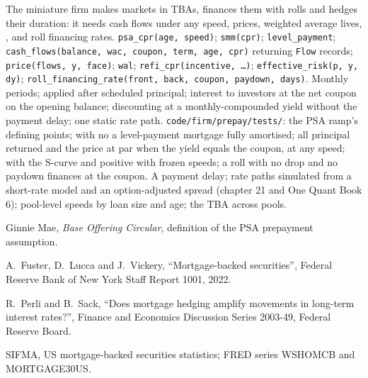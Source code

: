 \begin{build}
 The miniature firm makes markets in TBAs, finances them with
rolls and hedges their duration: it needs cash flows under any speed, prices,
weighted average lives, , and roll financing rates.
 \texttt{psa\_cpr(age, speed)}; \texttt{smm(cpr)};
\texttt{level\_payment}; \texttt{cash\_flows(balance, wac, coupon, term, age,
cpr)} returning \texttt{Flow} records; \texttt{price(flows, y, face)};
\texttt{wal}; \texttt{refi\_cpr(incentive, \ldots)};
\texttt{effective\_risk(p, y, dy)}; \texttt{roll\_financing\_rate(front, back,
coupon, paydown, days)}.
 Monthly periods;  applied after scheduled principal;
interest to investors at the net coupon on the opening balance; discounting at
a monthly-compounded yield without the payment delay; one static rate path.
 \texttt{code/firm/prepay/tests/}: the PSA ramp's
defining points; with no  a level-payment mortgage fully amortised;
all principal returned and the price at par when the yield equals the coupon,
at any speed;  with the S-curve and positive with frozen
speeds; a roll with no drop and no paydown finances at the coupon.
 A payment delay; rate paths simulated from a short-rate model
and an option-adjusted spread (chapter 21 and One Quant Book 6); pool-level
speeds by loan size and age; the TBA  across pools.
\end{build}

\begin{omsources}
\item Ginnie Mae, \emph{Base Offering Circular}, definition of the PSA
prepayment assumption.
\item A.~Fuster, D.~Lucca and J.~Vickery, ``Mortgage-backed securities'',
Federal Reserve Bank of New York Staff Report 1001, 2022.
\item R.~Perli and B.~Sack, ``Does mortgage hedging amplify movements in
long-term interest rates?'', Finance and Economics Discussion Series 2003-49,
Federal Reserve Board.
\item SIFMA, US mortgage-backed securities statistics; FRED series WSHOMCB and
MORTGAGE30US.
\end{omsources}

